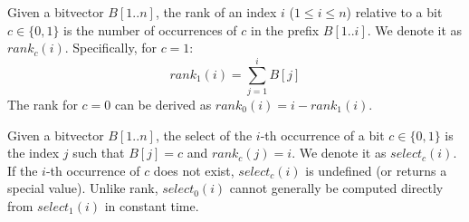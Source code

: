 \begin{definition}\label{def:rank}
    Given a bitvector $B[1..n]$, the \textsf{rank} of an index $i$ ($1 \le i \le n$) relative to a bit $c \in \{0, 1\}$ is the number of occurrences of $c$ in the prefix $B[1..i]$. We denote it as $rank_c(i)$.
    Specifically, for $c=1$:
    \begin{equation*}
        rank_1(i) = \sum_{j=1}^{i} B[j]
    \end{equation*}
    The rank for $c=0$ can be derived as $rank_0(i) = i - rank_1(i)$.
\end{definition}

\begin{definition}\label{def:select}
    Given a bitvector $B[1..n]$, the \textsf{select} of the $i$-th occurrence of a bit $c \in \{0, 1\}$ is the index $j$ such that $B[j]=c$ and $rank_c(j) = i$. We denote it as $select_c(i)$. If the $i$-th occurrence of $c$ does not exist, $select_c(i)$ is undefined (or returns a special value). Unlike \textsf{rank}, $select_0(i)$ cannot generally be computed directly from $select_1(i)$ in constant time.
\end{definition}

